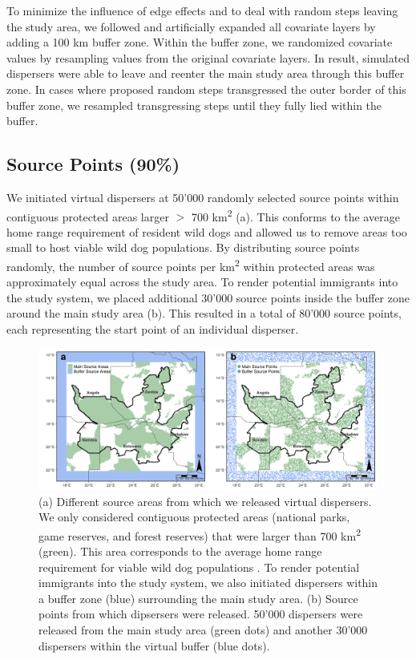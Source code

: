 \documentclass[abstract=on,10pt,a4paper,bibliography=totocnumbered]{article}
\begin{document}
To minimize the influence of edge effects and to deal with random steps leaving
the study area, we followed \citep{Koen.2010} and artificially expanded all
covariate layers by adding a 100 km buffer zone. Within the buffer zone, we
randomized covariate values by resampling values from the original covariate
layers. In result, simulated dispersers were able to leave and reenter the main
study area through this buffer zone. In cases where proposed random steps
transgressed the outer border of this buffer zone, we resampled transgressing
steps until they fully lied within the buffer.

\subsection{Source Points (90\%)}
We initiated virtual dispersers at 50'000 randomly selected source points within
contiguous protected areas larger \(>\) 700 km\textsuperscript{2}
(a). This conforms to the average home range requirement of
resident wild dogs \citep{Pomilia.2015} and allowed us to remove areas too small
to host viable wild dog populations. By distributing source points randomly, the
number of source points per km\textsuperscript{2} within protected areas was
approximately equal across the study area. To render potential immigrants into
the study system, we placed additional 30'000 source points inside the buffer
zone around the main study area (b). This resulted in a total
of 80'000 source points, each representing the start point of an individual
disperser.

\begin{figure}[htbp]
  \begin{center}
    \includegraphics[width = \textwidth]{99_SourceAreas.png}
    \caption{(a) Different source areas from which we released virtual
    dispersers. We only considered contiguous protected areas (national parks,
    game reserves, and forest reserves) that were larger than 700
    km\textsuperscript{2} (green). This area corresponds to the average home
    range requirement for viable wild dog populations \citep{Pomilia.2015}. To
    render potential immigrants into the study system, we also initiated
    dispersers within a buffer zone (blue) surrounding the main study area. (b)
    Source points from which dipsersers were released. 50'000 dispersers were
    released from the main study area (green dots) and another 30'000 dispersers
    within the virtual buffer (blue dots).}
    \label{SourcePoints}
  \end{center}
\end{figure}
\end{document}
